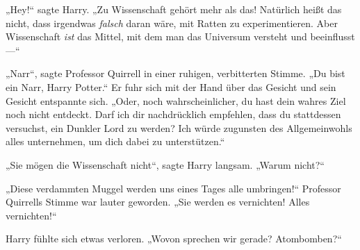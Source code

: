 „Hey!“ sagte Harry.
„Zu Wissenschaft gehört mehr als das! Natürlich heißt das nicht, dass irgendwas \emph{falsch} daran wäre, mit Ratten zu experimentieren. Aber Wissenschaft \emph{ist} das Mittel, mit dem man das Universum versteht und beeinflusst —“

„Narr“, sagte Professor Quirrell in einer ruhigen, verbitterten Stimme.
„Du bist ein Narr, Harry Potter.“ Er fuhr sich mit der Hand über das Gesicht und sein Gesicht entspannte sich.
„Oder, noch wahrscheinlicher, du hast dein wahres Ziel noch nicht entdeckt. Darf ich dir nachdrücklich empfehlen, dass du stattdessen versuchst, ein Dunkler Lord zu werden? Ich würde zugunsten des Allgemeinwohls alles unternehmen, um dich dabei zu unterstützen.“

„Sie mögen die Wissenschaft nicht“, sagte Harry langsam.
„Warum nicht?“

„Diese verdammten Muggel werden uns eines Tages alle umbringen!“ Professor Quirrells Stimme war lauter geworden.
„Sie werden es vernichten! Alles vernichten!“

Harry fühlte sich etwas verloren.
„Wovon sprechen wir gerade? Atombomben?“

